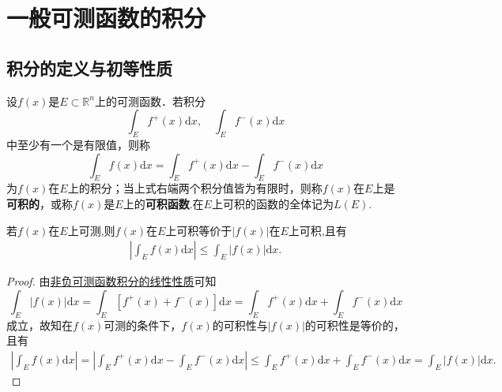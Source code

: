 \documentclass[../../main.tex]{subfiles}%
\begin{document}
\section{一般可测函数的积分}

\subsection{积分的定义与初等性质}

\begin{definition}
设\(f(x)\)是\(E \subset \mathbb{R}^n\)上的可测函数．若积分
\[
\int_E f^+(x) \mathrm{d}x, \quad \int_E f^-(x) \mathrm{d}x
\]
中至少有一个是有限值，则称
\[
\int_E f(x) \mathrm{d}x = \int_E f^+(x) \mathrm{d}x - \int_E f^-(x) \mathrm{d}x
\]
为\(f(x)\)在\(E\)上的积分；当上式右端两个积分值皆为有限时，则称\(f(x)\)在\(E\)上是\textbf{可积的}，或称\(f(x)\)是\(E\)上的\textbf{可积函数}.在\(E\)上可积的函数的全体记为\(L(E)\).
\end{definition}

\begin{theorem}\label{theorem:f与f绝对值的可积性等价}
若\(f(x)\)在$E$上可测,则\(f(x)\)在$E$上可积等价于\(|f(x)|\)在$E$上可积,且有
\begin{align*}
\left| \int_E f(x) \mathrm{d}x \right| \leqslant \int_E |f(x)| \mathrm{d}x. 
\end{align*}
\end{theorem}
\begin{proof}

由\hyperref[theorem:非负可测函数积分的线性性质]{非负可测函数积分的线性性质}可知
\[
\int_E{|f(x)|\mathrm{d}x}=\int_E{\left[ f^+\left( x \right) +f^-\left( x \right) \right] \mathrm{d}x}=\int_E{f^+(x)\mathrm{d}x}+\int_E{f^-(x)\mathrm{d}x}
\]
成立，故知在\(f(x)\)可测的条件下，\(f(x)\)的可积性与\(|f(x)|\)的可积性是等价的，且有
\begin{align*}
\left| \int_E{f(x)\mathrm{d}x} \right|=\left| \int_E{f^+(x)\mathrm{d}x}-\int_E{f^-(x)\mathrm{d}x} \right|\leqslant \int_E{f^+(x)\mathrm{d}x}+\int_E{f^-(x)\mathrm{d}x}=\int_E{|f(x)|\mathrm{d}x}.
\end{align*}

\end{proof}
\end{document}
